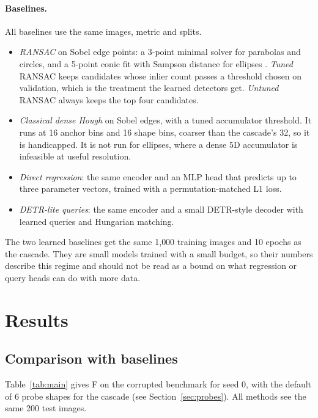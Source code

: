 \documentclass[11pt]{article}
\begin{document}
\paragraph{Baselines.} All baselines use the same images, metric and splits.
\begin{itemize}
  \item \emph{RANSAC} on Sobel edge points: a 3-point minimal solver for parabolas and circles, and a 5-point conic fit with Sampson distance for ellipses \citep{fitzgibbon1999ellipse,hartley2004mvg}. \emph{Tuned} RANSAC keeps candidates whose inlier count passes a threshold chosen on validation, which is the treatment the learned detectors get. \emph{Untuned} RANSAC always keeps the top four candidates.
  \item \emph{Classical dense Hough} on Sobel edges, with a tuned accumulator threshold. It runs at 16 anchor bins and 16 shape bins, coarser than the cascade's 32, so it is handicapped. It is not run for ellipses, where a dense 5D accumulator is infeasible at useful resolution.
  \item \emph{Direct regression}: the same encoder and an MLP head that predicts up to three parameter vectors, trained with a permutation-matched L1 loss.
  \item \emph{DETR-lite queries}: the same encoder and a small DETR-style decoder with learned queries and Hungarian matching.
\end{itemize}
The two learned baselines get the same 1{,}000 training images and 10 epochs as the cascade. They are small models trained with a small budget, so their numbers describe this regime and should not be read as a bound on what regression or query heads can do with more data.

\section{Results}
\label{sec:results}

\subsection{Comparison with baselines}
Table~\ref{tab:main} gives F on the corrupted benchmark for seed 0, with the default of 6 probe shapes for the cascade (see Section~\ref{sec:probes}). All methods see the same 200 test images.
\end{document}

